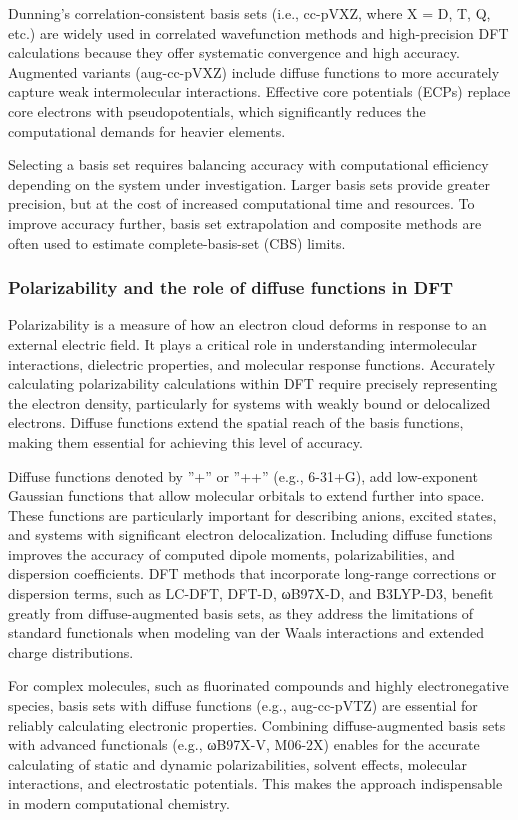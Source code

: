 Dunning’s correlation-consistent basis sets (i.e., cc-pVXZ, where X = D, T, Q, etc.) are widely used in correlated wavefunction methods and high-precision DFT calculations because they offer systematic convergence and high accuracy. Augmented variants (aug-cc-pVXZ) include diffuse functions to more accurately capture weak intermolecular interactions. Effective core potentials (ECPs) replace core electrons with pseudopotentials, which significantly reduces the computational demands for heavier elements. 

Selecting a basis set requires balancing accuracy with computational efficiency depending on the system under investigation. Larger basis sets provide greater precision, but at the cost of increased computational time and resources. To improve accuracy further, basis set extrapolation and composite methods are often used to estimate complete-basis-set (CBS) limits.

\subsubsection{Polarizability and the role of diffuse functions in DFT}

Polarizability is a measure of  how an electron cloud deforms in response to an external electric field. It plays a critical role in understanding intermolecular interactions, dielectric properties, and molecular response functions. Accurately calculating polarizability calculations within DFT require precisely representing the electron density, particularly for systems with weakly bound or delocalized electrons. Diffuse functions extend the spatial reach of the basis functions, making them essential for achieving this level of accuracy. 

Diffuse functions denoted by ”+” or ”++” (e.g., 6-31+G), add low-exponent Gaussian functions that allow molecular orbitals to extend further into space. These functions are particularly important for describing anions, excited states, and systems with significant electron delocalization. Including diffuse functions improves the accuracy of computed dipole moments, polarizabilities, and dispersion coefficients. DFT methods that incorporate long-range corrections or dispersion terms, such as LC-DFT, DFT-D, ωB97X-D, and B3LYP-D3, benefit greatly from diffuse-augmented basis sets, as they address the limitations of standard functionals when modeling van der Waals interactions and extended charge distributions. 

For complex molecules, such as fluorinated compounds and highly electronegative species, basis sets with diffuse functions (e.g., aug-cc-pVTZ) are essential for reliably calculating electronic properties. Combining diffuse-augmented basis sets with advanced functionals (e.g., ωB97X-V, M06-2X) enables for the accurate calculating of static and dynamic polarizabilities, solvent effects, molecular interactions, and electrostatic potentials. This makes the approach indispensable in modern computational chemistry.

